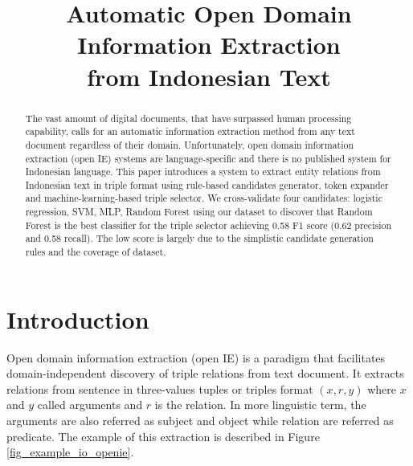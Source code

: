 \documentclass[conference,compsoc,12pt]{IEEEtran}
\begin{document}
\title{Automatic Open Domain Information Extraction\\from Indonesian Text}


\author{
	\and
}


\maketitle

\begin{abstract}

The vast amount of digital documents, that have surpassed human processing capability, calls for an automatic information extraction method from any text document regardless of their domain. Unfortunately, open domain information extraction (open IE) systems are language-specific and there is no published system for Indonesian language. This paper introduces a system to extract entity relations from Indonesian text in triple format using rule-based candidates generator, token expander and machine-learning-based triple selector. We cross-validate four candidates: logistic regression, SVM, MLP, Random Forest using our dataset to discover that Random Forest is the best classifier for the triple selector achieving 0.58 F1 score (0.62 precision and 0.58 recall). The low score is largely due to the simplistic candidate generation rules and the coverage of dataset.

\end{abstract}

\IEEEpeerreviewmaketitle

\section{Introduction}

Open domain information extraction (open IE) is a paradigm that facilitates domain-independent discovery of triple relations from text document\cite{banko2007open}. It extracts relations from sentence in three-values tuples or triples format $(x, r, y)$ where $x$ and $y$ called arguments and $r$ is the relation\cite{etzioni2011open}. In more linguistic term, the arguments are also referred as subject and object while relation are referred as predicate\cite{angeli2015leveraging}. The example of this extraction is described in Figure \ref{fig_example_io_openie}.
\end{document}
